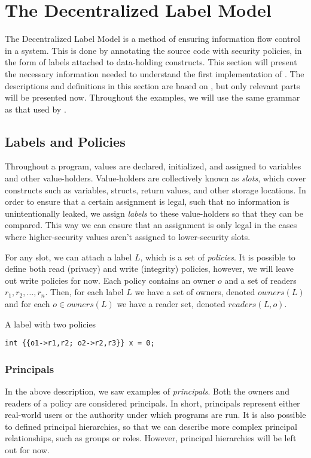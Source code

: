 
\section{The Decentralized Label Model}
The Decentralized Label Model \cite{myers1997, myers1998, myers2000} is a method of ensuring information flow control in a system.
This is done by annotating the source code with security policies, in the form of labels attached to data-holding constructs.
This section will present the necessary information needed to understand the first implementation of \thetool.
The descriptions and definitions in this section are based on \cite{myers1997, myers1998, myers2000}, but only relevant parts will be presented now.
Throughout the examples, we will use the same grammar as that used by \thetool.

\subsection{Labels and Policies}
Throughout a program, values are declared, initialized, and assigned to variables and other value-holders.
Value-holders are collectively known as \emph{slots}, which cover constructs such as variables, structs, return values, and other storage locations.
In order to ensure that a certain assignment is legal, such that no information is unintentionally leaked, we assign \emph{labels} to these value-holders so that they can be compared.
This way we can ensure that an assignment is only legal in the cases where higher-security values aren't assigned to lower-security slots.

For any slot, we can attach a label $L$, which is a set of \emph{policies}.
It is possible to define both read (privacy) and write (integrity) policies, however, we will leave out write policies for now.
Each policy contains an owner $o$ and a set of readers $r_1,r_2,\dots,r_n$.
Then, for each label $L$ we have a set of owners, denoted $owners(L)$ and for each $o \in owners(L)$ we have a reader set, denoted $readers(L, o)$.

\begin{example}{A label with two policies}\label{dlm:ex:simple_label}
  \begin{lstlisting}[style=dlmc]
int {{o1->r1,r2; o2->r2,r3}} x = 0;
  \end{lstlisting}
\end{example}

\subsubsection{Principals}
In the above description, we saw examples of \textit{principals}.
Both the owners and readers of a policy are considered principals.
In short, principals represent either real-world users or the authority under which programs are run.
It is also possible to defined principal hierarchies, so that we can describe more complex principal relationships, such as groups or roles.
However, principal hierarchies will be left out for now.

